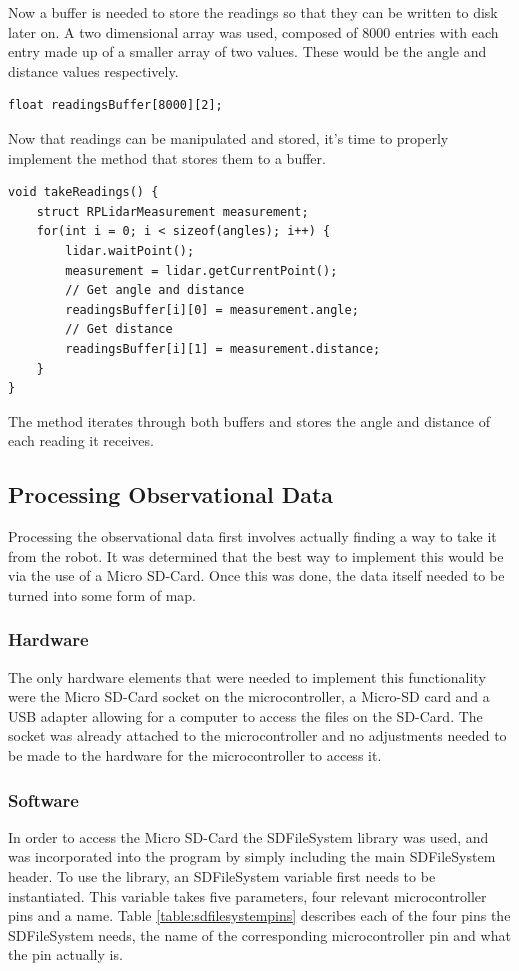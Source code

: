 				Now a buffer is needed to store the readings so that they can be written to disk later on. A two dimensional array was used, composed of 8000 entries with each entry made up of a smaller array of two values. These would be the angle and distance values respectively.
				\begin{lstlisting}
float readingsBuffer[8000][2];
				\end{lstlisting}
				
				Now that readings can be manipulated and stored, it's time to properly implement the method that stores them to a buffer.
				\begin{lstlisting}
void takeReadings() {
	struct RPLidarMeasurement measurement;
	for(int i = 0; i < sizeof(angles); i++) {
		lidar.waitPoint();
		measurement = lidar.getCurrentPoint();
		// Get angle and distance
		readingsBuffer[i][0] = measurement.angle;
		// Get distance
		readingsBuffer[i][1] = measurement.distance;
	}
}
				\end{lstlisting}
				The method iterates through both buffers and stores the angle and distance of each reading it receives.		
				
			\subsection{Processing Observational Data}
			Processing the observational data first involves actually finding a way to take it from the robot. It was determined that the best way to implement this would be via the use of a Micro SD-Card. Once this was done, the data itself needed to be turned into some form of map.
			
				\subsubsection{Hardware}
				The only hardware elements that were needed to implement this functionality were the Micro SD-Card socket on the microcontroller, a Micro-SD card and a USB adapter allowing for a computer to access the files on the SD-Card. The socket was already attached to the microcontroller and no adjustments needed to be made to the hardware for the microcontroller to access it.
				
				\subsubsection{Software}
				In order to access the Micro SD-Card the SDFileSystem library was used, and was incorporated into the program by simply including the main SDFileSystem header. To use the library, an SDFileSystem variable first needs to be instantiated. This variable takes five parameters, four relevant microcontroller pins and a name. Table \ref{table:sdfilesystempins} describes each of the four pins the SDFileSystem needs, the name of the corresponding microcontroller pin and what the pin actually is.
	
